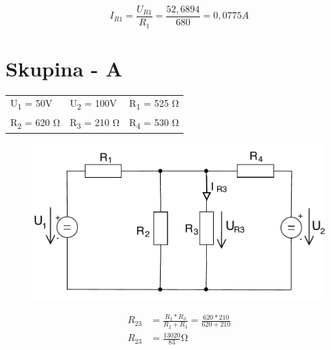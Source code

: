 \documentclass[12pt,a4paper]{article}
\begin{document}
\begin{equation}
	I_{R1} = \frac{U_{R1}}{R_1} = \frac{52,6894}{680} = 0,0775 A 
\end{equation}
\newpage
\section{Skupina - A}
\begin{tabular}{ l l l }
  U\textsubscript{1} = 50V & U\textsubscript{2} = 100V & R\textsubscript{1} = 525 \si{\ohm} \\
  R\textsubscript{2} = 620 \si{\ohm} & R\textsubscript{3} = 210 \si{\ohm} & R\textsubscript{4} = 530 \si{\ohm} \\
\end{tabular}

 \begin{minipage}{\linewidth}
      \centering
      \begin{minipage}{0.45\linewidth}
          \begin{figure}[H]
              \includegraphics[width=\linewidth]{Circuits/2-A.pdf}
          \end{figure}
      \end{minipage}
      \hspace{0.05\linewidth}
      \begin{minipage}{0.45\linewidth}
      	\begin{align*}
        		R_{23} &= \frac{R_2 * R_3}{R_2 + R_3} = \frac{620 * 210}{620 + 210} \\[0.5ex]
			R_{23} &= \frac{13020}{83} \si{\ohm} \\[0.5ex]
		\end{align*}
      \end{minipage}
  \end{minipage}
  
\end{document}
